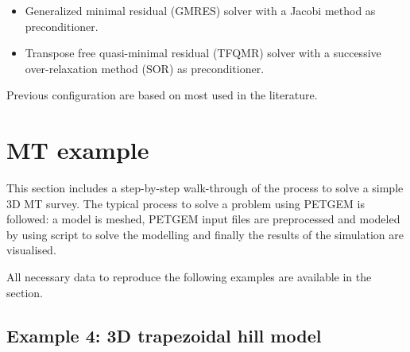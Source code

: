 \documentclass[letterpaper,10pt,english]{sphinxmanual}
\begin{document}
\begin{itemize}
\item {} 
Generalized minimal residual (GMRES) solver with a Jacobi method as preconditioner.

\begin{sphinxVerbatim}[commandchars=\\\{\}]
 
 
 
\end{sphinxVerbatim}

\item {} 
Transpose free quasi-minimal residual (TFQMR) solver with a successive over-relaxation method (SOR) as preconditioner.

\begin{sphinxVerbatim}[commandchars=\\\{\}]
 
 
 
\end{sphinxVerbatim}

\end{itemize}

Previous configuration are based on most used in the literature.


\section{MT example}
\label{\detokenize{Manual:mt-example}}
This section includes a step-by-step walk-through of the process to solve a
simple 3D MT survey. The typical process to solve a problem using
PETGEM is followed: a model is meshed, PETGEM input files are preprocessed and modeled by
using  script to solve
the modelling and finally the results of the simulation are visualised.

All necessary data to reproduce the following examples are available in the
{\hyperref[\detokenize{Download:download}]{}} section.


\subsection{Example 4: 3D trapezoidal hill model}
\label{\detokenize{Manual:example-4-3d-trapezoidal-hill-model}}
\end{document}
